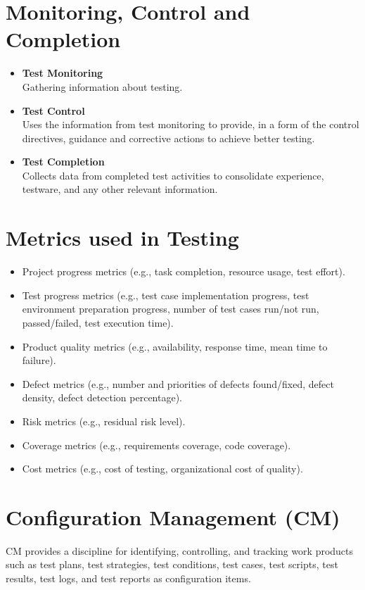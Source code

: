 \documentclass{article}
\begin{document}
\begin{multicols}{3}
{\section*{Monitoring, Control and Completion}
\begin{itemize}
\item \textbf{Test Monitoring}\\
Gathering information about testing.
\item \textbf{Test Control}\\
Uses the information from test monitoring to provide, in a form of the control directives, guidance and corrective actions to achieve better testing.
\item \textbf{Test Completion}\\
Collects data from completed test activities to consolidate experience, testware, and any other relevant information.
\end{itemize}

\section*{Metrics used in Testing}
\begin{itemize}
    \item Project progress metrics (e.g., task completion, resource usage, test effort).
    \item Test progress metrics (e.g., test case implementation progress, test environment preparation progress, number of test cases run/not run, passed/failed, test execution time).
    \item Product quality metrics (e.g., availability, response time, mean time to failure).
    \item Defect metrics (e.g., number and priorities of defects found/fixed, defect density, defect detection percentage).
    \item Risk metrics (e.g., residual risk level).
    \item Coverage metrics (e.g., requirements coverage, code coverage).
    \item Cost metrics (e.g., cost of testing, organizational cost of quality).
\end{itemize}

\section*{Configuration Management (CM)}
CM provides a discipline for identifying, controlling, and tracking work products such as test plans, test strategies, test conditions, test cases, test scripts, test results, test logs, and test reports as configuration items.\\

}
\end{multicols}
\end{document}
